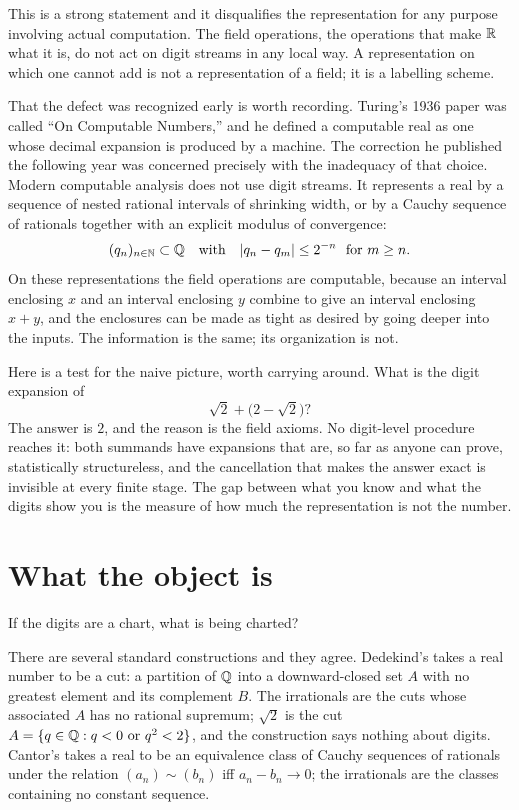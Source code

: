 \documentclass{essay}
\begin{document}
This is a strong statement and it disqualifies the representation for any
purpose involving actual computation. The field operations, the operations that
make $\mathbb{R}$ what it is, do not act on digit streams in any local way. A
representation on which one cannot add is not a representation of a field; it
is a labelling scheme.

That the defect was recognized early is worth recording. Turing's 1936 paper
was called ``On Computable Numbers,'' and he defined a computable real as one
whose decimal expansion is produced by a machine. The correction he published
the following year was concerned precisely with the inadequacy of that choice.
Modern computable analysis does not use digit streams. It represents a real by
a sequence of nested rational intervals of shrinking width, or by a Cauchy
sequence of rationals together with an explicit modulus of convergence:
\[
  (q_n)_{n \in \mathbb{N}} \subset \mathbb{Q}
  \quad \text{with} \quad
  |q_n - q_m| \le 2^{-n} \ \text{ for } m \ge n .
\]
On these representations the field operations are computable, because an
interval enclosing $x$ and an interval enclosing $y$ combine to give an
interval enclosing $x+y$, and the enclosures can be made as tight as desired by
going deeper into the inputs. The information is the same; its organization is
not.

Here is a test for the naive picture, worth carrying around. What is the digit
expansion of
\[
  \sqrt2 + \bigl(2 - \sqrt2\bigr) ?
\]
The answer is $2$, and the reason is the field axioms. No digit-level procedure
reaches it: both summands have expansions that are, so far as anyone can prove,
statistically structureless, and the cancellation that makes the answer exact
is invisible at every finite stage. The gap between what you know and what the
digits show you is the measure of how much the representation is not the
number.

\section{What the object is}

If the digits are a chart, what is being charted?

There are several standard constructions and they agree. Dedekind's takes a
real number to be a cut: a partition of $\mathbb{Q}$ into a downward-closed set $A$
with no greatest element and its complement $B$. The irrationals are the cuts
whose associated $A$ has no rational supremum; $\sqrt2$ is the cut
$A = \{q \in \mathbb{Q} : q < 0 \text{ or } q^2 < 2\}$, and the construction says
nothing about digits. Cantor's takes a real to be an equivalence class of
Cauchy sequences of rationals under the relation $(a_n) \sim (b_n)$ iff
$a_n - b_n \to 0$; the irrationals are the classes containing no constant
sequence.
\end{document}
